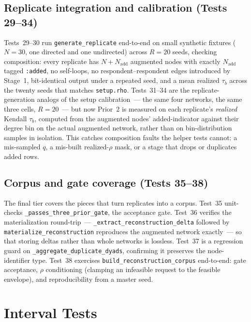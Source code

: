\documentclass[11pt]{article}
\begin{document}
\subsection{Replicate integration and calibration (Tests 29--34)}

Tests~29--30 run \texttt{generate\_replicate} end-to-end on small synthetic fixtures ($N=30$, one directed and one undirected) across $R=20$ seeds, checking composition: every replicate has $N + N_{\text{add}}$ augmented nodes with exactly $N_{\text{add}}$ tagged \texttt{:added}, no self-loops, no respondent--respondent edges introduced by Stage~1, bit-identical output under a repeated seed, and a mean realized $\tau_b$ across the twenty seeds that matches \texttt{setup.rho}. Tests~31--34 are the replicate-generation analogs of the setup calibration~--- the same four networks, the same three cells, $R=20$~--- but now Prior~2 is measured on each replicate's \emph{realized} Kendall $\tau_b$, computed from the augmented nodes' added-indicator against their degree bin on the actual augmented network, rather than on bin-distribution samples in isolation. This catches composition faults the helper tests cannot: a mis-sampled $q$, a mis-built realized-$\rho$ mask, or a stage that drops or duplicates added rows.

\subsection{Corpus and gate coverage (Tests 35--38)}

The final tier covers the pieces that turn replicates into a corpus. Test~35 unit-checks \texttt{\_passes\_three\_prior\_gate}, the acceptance gate. Test~36 verifies the materialization round-trip~--- \texttt{\_extract\_reconstruction\_delta} followed by \texttt{materialize\_reconstruction} reproduces the augmented network exactly~--- so that storing deltas rather than whole networks is lossless. Test~37 is a regression guard on \texttt{\_aggregate\_duplicate\_dyads}, confirming it preserves the node-identifier type. Test~38 exercises \texttt{build\_reconstruction\_corpus} end-to-end: gate acceptance, $\rho$ conditioning (clamping an infeasible request to the feasible envelope), and reproducibility from a master seed.

\section{Interval Tests}
\label{sec:interval-tests}
\end{document}
